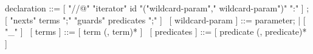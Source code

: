 \begin{syntax}
  declaration ::= [ "//@" "iterator" id "("wildcard-param","
    wildcard-param")" ":" ] ;
  [ "nexts" terms ";" "guards" predicates ";" ]
  \
  [ wildcard-param ] ::= parameter;
  | [ "_" ]
  \
  [ terms ] ::= [ term (, term)* ]
  \
  [ predicates ] ::= [ predicate (, predicate)* ]
\end{syntax}
